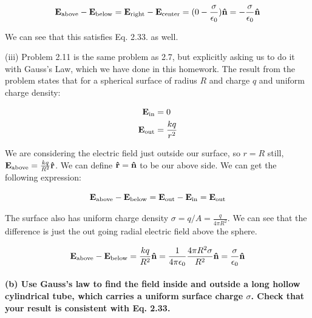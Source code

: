 \documentclass{article}
\numberwithin{equation}{section}
\numberwithin{figure}{section}
\newcommand{\vbh}[1]{\vb{\hat{#1}}}
\begin{document}
\begin{equation}
    \vb E_{\text{above}} - \vb E_{\text{below}} = \vb E_{\text{right}} - \vb E_{\text{center}} = (0 - \frac{\sigma}{\epsilon_0}) \vbh n = - \frac{\sigma}{\epsilon_0} \vbh n
\end{equation}

We can see that this satisfies Eq. 2.33. as well.

(iii) Problem 2.11 is the same problem as 2.7, but explicitly asking us to do it with Gauss's Law, which we have done in this homework. The result from the problem states that for a spherical surface of radius $R$ and charge $q$ and uniform charge density:

\begin{equation}
\begin{split}
        \vb E_{\text{in}} &= 0 \\
        \vb E_{\text{out}} &= \frac{kq}{r^2}
\end{split}
\end{equation}

We are considering the electric field just outside our surface, so $r = R$ still, $\vb E_{\text{above}} = \frac{kq}{R^2} \vbh r$. We can define $\vbh r = \vbh n$ to be our above side. We can get the following expression:

\begin{equation}
    \vb E_{\text{above}} - \vb E_{\text{below}} = \vb E_{\text{out}} - \vb E_{\text{in}} = \vb E_{\text{out}} 
\end{equation}

The surface also has uniform charge density $\sigma = q / A = \frac{q}{4\pi R^2}$. We can see that the difference is just the out going radial electric field above the sphere.

\begin{equation}
    \vb E_{\text{above}} - \vb E_{\text{below}}= \frac{kq}{R^2} \vbh n = \frac{1}{4\pi \epsilon_0} \frac{4\pi R^2 \sigma}{R^2} \vbh n = \frac{\sigma}{\epsilon_0} \vbh n
\end{equation}

\paragraph{(b) Use Gauss’s law to find the field inside and outside a long hollow cylindrical tube, which carries a uniform surface charge $\sigma$. Check that your result is consistent with Eq. 2.33. \\}
\end{document}
